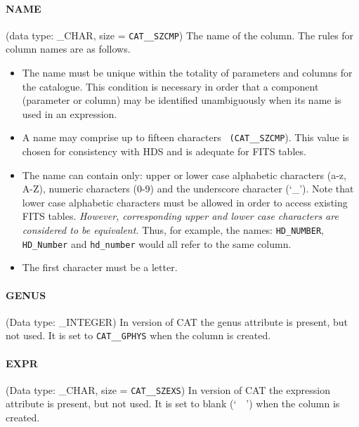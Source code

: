 \paragraph{NAME}
(data type: \_CHAR, size = {\tt CAT\_\_SZCMP})
The name of the column. The rules for column names are as follows.

\begin{itemize}

  \item The name must be unique within the totality of parameters and 
   columns for the catalogue. This condition is necessary in order that 
   a component (parameter or column) may be identified unambiguously 
   when its name is used in an expression.

  \item A name may comprise up to fifteen characters {\tt
   (CAT\_\_SZCMP}). This value is chosen for consistency with HDS and 
   is adequate for FITS tables.

  \item The name can contain only: upper or lower case alphabetic 
   characters (a-z, A-Z), numeric characters (0-9) and the underscore 
   character (`\_'). Note that lower case alphabetic characters must
   be allowed in order to access existing FITS tables. {\it However,
   corresponding upper and lower case characters are considered to be
   equivalent.} Thus, for example, the names: {\tt HD\_NUMBER}, {\tt
   HD\_Number} and {\tt hd\_number} would all refer to the same column.

  \item The first character must be a letter.
  
\end{itemize}

\paragraph{GENUS}
(Data type: \_INTEGER)
In version \CATversion of CAT the genus attribute is present, but not
used. It is set to {\tt CAT\_\_GPHYS} when the column is created.

\paragraph{EXPR}
(Data type: \_CHAR, size = {\tt CAT\_\_SZEXS})
In version \CATversion of CAT the expression attribute is present, but 
not used. It is set to blank (`~~') when the column is created.

